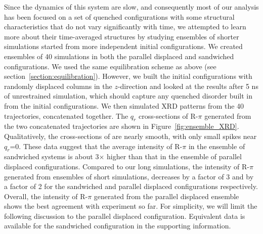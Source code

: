 \documentclass[journal=jpcbfk,manuscript=article]{achemso}
\begin{document}
  Since the dynamics of this system are slow, and consequently most
  of our analysis has been focused on a set of quenched configurations
  with some structural characteristics that do not vary significantly
  with time, we attempted to learn more about their time-averaged 
  structures by studying ensembles of shorter simulations started
  from more independent initial configurations. We created ensembles
  of 40 simulations in both the parallel displaced and sandwiched 
  configurations. We used the same equilibration scheme as above 
  (see section~\ref{section:equilibration}). However, we built the 
  initial configurations with randomly displaced columns in the 
  $z$-direction and looked at the results after 5 ns of unrestrained
  simulation, which should capture any quenched disorder built in 
  from the initial configurations. We then simulated XRD patterns 
  from the 40 trajectories, concatenated together. The $q_r$ 
  cross-sections of R-$\pi$ generated from the two concatenated 
  trajectories are shown in Figure~\ref{fig:ensemble_XRD}. 
  Qualitatively, the cross-sections of are nearly smooth, with only
  small spikes near $q_r$=0. These data suggest that the average 
  intensity of R-$\pi$ in the ensemble of sandwiched systems is 
  about 3$\times$ higher than that in the ensemble of parallel displaced
  configurations. Compared to our long simulations, the intensity of R-$\pi$
  generated from ensembles of short simulations, decreases by a factor of 3
  and by a factor of 2 for the sandwiched and parallel displaced configurations respectively. 
  Overall, the intensity of R-$\pi$ generated from the parallel displaced 
  ensemble shows the best agreement with experiment so far. For simplicity, 
  we will limit the following discussion to the parallel displaced configuration.
  Equivalent data is available for the sandwiched configuration in the
  supporting information. %
\end{document}

